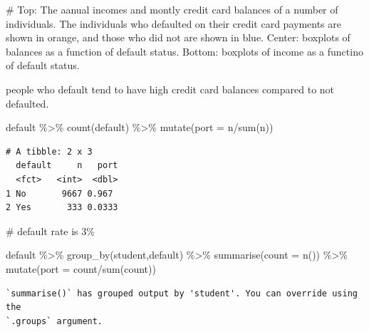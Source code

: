 \documentclass[
  letterpaper,
  DIV=11,
  numbers=noendperiod]{scrreprt}
\newenvironment{Shaded}{\begin{snugshade}}{\end{snugshade}}
\newcommand{\AttributeTok}[1]{\textcolor[rgb]{0.65,0.35,0.00}{#1}}
\newcommand{\CommentTok}[1]{\textcolor[rgb]{0.41,0.41,0.41}{#1}}
\newcommand{\FunctionTok}[1]{\textcolor[rgb]{0.02,0.16,0.49}{#1}}
\newcommand{\NormalTok}[1]{\textcolor[rgb]{0.33,0.33,0.33}{#1}}
\newcommand{\SpecialCharTok}[1]{\textcolor[rgb]{0.00,0.46,0.62}{#1}}
\begin{document}
\begin{Shaded}
\begin{Highlighting}[]
\CommentTok{\# Top: The aanual incomes and montly credit card balances of a number of individuals. The individuals who defaulted on their credit card payments are shown in orange, and those who did not are shown in blue. Center: boxplots of balances as a function of default status. Bottom: boxplots of income as a functino of default status.}
\end{Highlighting}
\end{Shaded}

people who default tend to have high credit card balances compared to
not defaulted.

\begin{Shaded}
\begin{Highlighting}[]
\NormalTok{default }\SpecialCharTok{\%\textgreater{}\%} 
  \FunctionTok{count}\NormalTok{(default) }\SpecialCharTok{\%\textgreater{}\%} 
  \FunctionTok{mutate}\NormalTok{(}\AttributeTok{port =}\NormalTok{ n}\SpecialCharTok{/}\FunctionTok{sum}\NormalTok{(n))}
\end{Highlighting}
\end{Shaded}

\begin{verbatim}
# A tibble: 2 x 3
  default     n   port
  <fct>   <int>  <dbl>
1 No       9667 0.967 
2 Yes       333 0.0333
\end{verbatim}

\begin{Shaded}
\begin{Highlighting}[]
\CommentTok{\# default rate is 3\%}
\end{Highlighting}
\end{Shaded}

\begin{Shaded}
\begin{Highlighting}[]
\NormalTok{default }\SpecialCharTok{\%\textgreater{}\%} 
  \FunctionTok{group\_by}\NormalTok{(student,default) }\SpecialCharTok{\%\textgreater{}\%} 
  \FunctionTok{summarise}\NormalTok{(}\AttributeTok{count =} \FunctionTok{n}\NormalTok{()) }\SpecialCharTok{\%\textgreater{}\%} 
  \FunctionTok{mutate}\NormalTok{(}\AttributeTok{port =}\NormalTok{ count}\SpecialCharTok{/}\FunctionTok{sum}\NormalTok{(count))}
\end{Highlighting}
\end{Shaded}

\begin{verbatim}
`summarise()` has grouped output by 'student'. You can override using the
`.groups` argument.
\end{verbatim}
\end{document}
